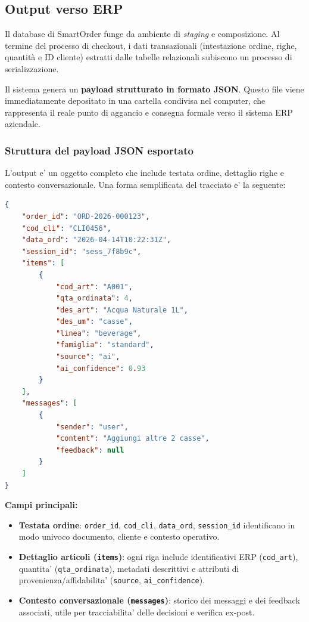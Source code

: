 \documentclass[a4paper, 11pt, oneside]{scrartcl}
\begin{document}
\subsection{Output verso ERP}
Il database di SmartOrder funge da ambiente di \textit{staging} e composizione. Al termine del processo di checkout, i dati transazionali (intestazione ordine, righe, quantità e ID cliente) estratti dalle tabelle relazionali subiscono un processo di serializzazione. 

Il sistema genera un \textbf{payload strutturato in formato JSON}. Questo file viene immediatamente depositato in una cartella condivisa nel computer, che rappresenta il reale punto di aggancio e consegna formale verso il sistema ERP aziendale.

\subsubsection{Struttura del payload JSON esportato}
L'output e' un oggetto completo che include testata ordine, dettaglio righe e contesto conversazionale. Una forma semplificata del tracciato e' la seguente:

\begin{lstlisting}[language=json,caption={Struttura logica del JSON esportato verso ERP.},label={lst:json-export-erp}]
{
    "order_id": "ORD-2026-000123",
    "cod_cli": "CLI0456",
    "data_ord": "2026-04-14T10:22:31Z",
    "session_id": "sess_7f8b9c",
    "items": [
        {
            "cod_art": "A001",
            "qta_ordinata": 4,
            "des_art": "Acqua Naturale 1L",
            "des_um": "casse",
            "linea": "beverage",
            "famiglia": "standard",
            "source": "ai",
            "ai_confidence": 0.93
        }
    ],
    "messages": [
        {
            "sender": "user",
            "content": "Aggiungi altre 2 casse",
            "feedback": null
        }
    ]
}
\end{lstlisting}

\noindent\textbf{Campi principali:}
\begin{itemize}
        \item \textbf{Testata ordine}: \texttt{order\_id}, \texttt{cod\_cli}, \texttt{data\_ord}, \texttt{session\_id} identificano in modo univoco documento, cliente e contesto operativo.
        \item \textbf{Dettaglio articoli (\texttt{items})}: ogni riga include identificativi ERP (\texttt{cod\_art}), quantita' (\texttt{qta\_ordinata}), metadati descrittivi e attributi di provenienza/affidabilita' (\texttt{source}, \texttt{ai\_confidence}).
        \item \textbf{Contesto conversazionale (\texttt{messages})}: storico dei messaggi e dei feedback associati, utile per tracciabilita' delle decisioni e verifica ex-post.
\end{itemize}
\end{document}
